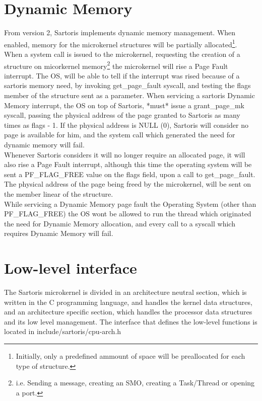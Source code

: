 \documentclass[11pt, letterpaper, twoside, english]{book}
\begin{document}
\section{Dynamic Memory} \label{sec:dynamicmemory}

From version 2, Sartoris implements dynamic memory management. When enabled, memory for the microkernel structures will be partially allocated\footnote{Initially, only a predefined ammount of space will be preallocated for each type of structure.}.\\
When a system call is issued to the microkernel, requesting the creation of a structure on micorkernel memory\footnote{i.e. Sending a message, creating an SMO, creating a Task/Thread or opening a port.} the microkernel will rise a Page Fault interrupt. The OS, will be able to tell if the interrupt was rised because of a sartoris memory need, by invoking \textsf{get\_page\_fault} syscall, and testing the flags member of the structure sent as a parameter. When servicing a sartoris Dynamic Memory interrupt, the OS on top of Sartoris, *must* issue a \textsf{grant\_page\_mk} syscall, passing the physical address of the page granted to Sartoris as many times as \textsf{flags - 1}. If the physical address is NULL (0), Sartoris will consider no page is available for him, and the system call which generated the need for dynamic memory will fail.\\ 
Whenever Sartoris considers it will no longer require an allocated page, it will also rise a Page Fault interrupt, although this time the operating system will be sent a \textsf{PF\_FLAG\_FREE} value on the \textsf{flags} field, upon a call to \textsf{get\_page\_fault}. The physical address of the page being freed by the microkernel, will be sent on the member \textsf{linear} of the structure.\\
While servicing a Dynamic Memory page fault the Operating System (other than \textsf{PF\_FLAG\_FREE}) the OS wont be allowed to run the thread which originated the need for Dynamic Memory allocation, and every call to a syscall which requires Dynamic Memory will fail.

\section{Low-level interface} \label{sec:lowlevelinterface}

The Sartoris microkernel is divided in an architecture neutral section, which is written in the C programming language, and handles the kernel data structures, and an architecture specific section, which handles the processor data structures and its low level management. The interface that defines the low-level functions is located in \textsf{include/sartoris/cpu-arch.h}
\end{document}
